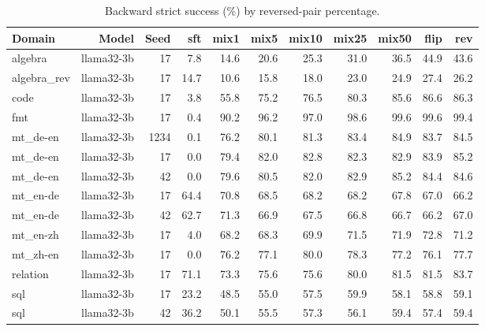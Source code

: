 \begin{table}[t]
\centering
\small
\begin{tabular}{lrrrrrrrrrr}
\toprule
Domain & Model & Seed & sft & mix1 & mix5 & mix10 & mix25 & mix50 & flip & rev \\
\midrule
algebra & llama32-3b & 17 & 7.8 & 14.6 & 20.6 & 25.3 & 31.0 & 36.5 & 44.9 & 43.6 \\
algebra\_rev & llama32-3b & 17 & 14.7 & 10.6 & 15.8 & 18.0 & 23.0 & 24.9 & 27.4 & 26.2 \\
code & llama32-3b & 17 & 3.8 & 55.8 & 75.2 & 76.5 & 80.3 & 85.6 & 86.6 & 86.3 \\
fmt & llama32-3b & 17 & 0.4 & 90.2 & 96.2 & 97.0 & 98.6 & 99.6 & 99.6 & 99.4 \\
mt\_de-en & llama32-3b & 1234 & 0.1 & 76.2 & 80.1 & 81.3 & 83.4 & 84.9 & 83.7 & 84.5 \\
mt\_de-en & llama32-3b & 17 & 0.0 & 79.4 & 82.0 & 82.8 & 82.3 & 82.9 & 83.9 & 85.2 \\
mt\_de-en & llama32-3b & 42 & 0.0 & 79.6 & 80.5 & 82.0 & 82.9 & 85.2 & 84.4 & 84.6 \\
mt\_en-de & llama32-3b & 17 & 64.4 & 70.8 & 68.5 & 68.2 & 68.2 & 67.8 & 67.0 & 66.2 \\
mt\_en-de & llama32-3b & 42 & 62.7 & 71.3 & 66.9 & 67.5 & 66.8 & 66.7 & 66.2 & 67.0 \\
mt\_en-zh & llama32-3b & 17 & 4.0 & 68.2 & 68.3 & 69.9 & 71.5 & 71.9 & 72.8 & 71.2 \\
mt\_zh-en & llama32-3b & 17 & 0.0 & 76.2 & 77.1 & 80.0 & 78.3 & 77.2 & 76.1 & 77.7 \\
relation & llama32-3b & 17 & 71.1 & 73.3 & 75.6 & 75.6 & 80.0 & 81.5 & 81.5 & 83.7 \\
sql & llama32-3b & 17 & 23.2 & 48.5 & 55.0 & 57.5 & 59.9 & 58.1 & 58.8 & 59.1 \\
sql & llama32-3b & 42 & 36.2 & 50.1 & 55.5 & 57.3 & 56.1 & 59.4 & 57.4 & 59.4 \\
\bottomrule
\end{tabular}
\caption{Backward strict success (\%) by reversed-pair percentage.}
\label{tab:dose}
\end{table}